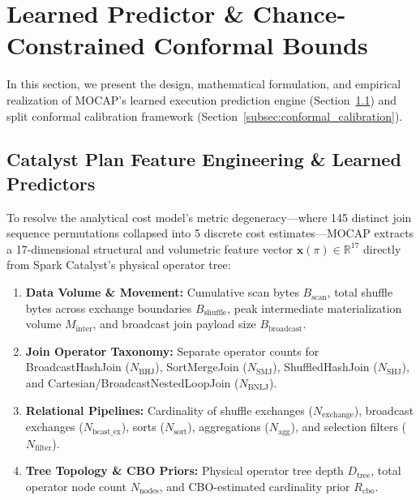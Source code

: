 \section{Learned Predictor \& Chance-Constrained Conformal Bounds}
\label{sec:predictor_conformal}

In this section, we present the design, mathematical formulation, and empirical realization of MOCAP's learned execution prediction engine (Section~\ref{subsec:feature_engineering}) and split conformal calibration framework (Section~\ref{subsec:conformal_calibration}).

\subsection{Catalyst Plan Feature Engineering \& Learned Predictors}
\label{subsec:feature_engineering}

To resolve the analytical cost model's metric degeneracy—where 145 distinct join sequence permutations collapsed into 5 discrete cost estimates—MOCAP extracts a 17-dimensional structural and volumetric feature vector $\mathbf{x}(\pi) \in \mathbb{R}^{17}$ directly from Spark Catalyst's physical operator tree:
\begin{enumerate}
    \item \textbf{Data Volume \& Movement:} Cumulative scan bytes $B_{\text{scan}}$, total shuffle bytes across exchange boundaries $B_{\text{shuffle}}$, peak intermediate materialization volume $M_{\text{inter}}$, and broadcast join payload size $B_{\text{broadcast}}$.
    \item \textbf{Join Operator Taxonomy:} Separate operator counts for BroadcastHashJoin ($N_{\text{BHJ}}$), SortMergeJoin ($N_{\text{SMJ}}$), ShuffledHashJoin ($N_{\text{SHJ}}$), and Cartesian/BroadcastNestedLoopJoin ($N_{\text{BNLJ}}$).
    \item \textbf{Relational Pipelines:} Cardinality of shuffle exchanges ($N_{\text{exchange}}$), broadcast exchanges ($N_{\text{bcast\_ex}}$), sorts ($N_{\text{sort}}$), aggregations ($N_{\text{agg}}$), and selection filters ($N_{\text{filter}}$).
    \item \textbf{Tree Topology \& CBO Priors:} Physical operator tree depth $D_{\text{tree}}$, total operator node count $N_{\text{nodes}}$, and CBO-estimated cardinality prior $R_{\text{cbo}}$.
\end{enumerate}

